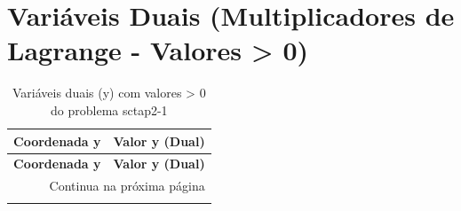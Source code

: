 \documentclass[12pt]{article}
\begin{document}
\section{Variáveis Duais (Multiplicadores de Lagrange - Valores > 0)}

\begin{longtable}{@{}cc@{}}
\caption{Variáveis duais (y) com valores > 0 do problema sctap2-1} \\
\toprule
\textbf{Coordenada y} & \textbf{Valor y (Dual)} \\
\midrule
\endfirsthead

\toprule
\textbf{Coordenada y} & \textbf{Valor y (Dual)} \\
\midrule
\endhead

\midrule \multicolumn{2}{r}{{Continua na próxima página}} \\ \midrule
\endfoot


\end{longtable}
\end{document}
